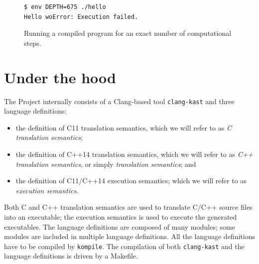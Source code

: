 \documentclass[nolot,nolof,nocover,printed]{fithesis3}
\newcommand{\krun}{\texttt{krun}\xspace}
\newcommand{\kompile}{\texttt{kompile}\xspace}
\newcommand{\clangKast}{\texttt{clang-kast}\xspace}
\newcommand{\Project}{Project\xspace}
\begin{document}
\begin{figure}[ht]
\begin{lstlisting}
$ env DEPTH=675 ./hello
Hello woError: Execution failed.
\end{lstlisting}
\caption{Running a compiled program for an exact number of computational steps.}
\label{fig:runCompiledProgramWithDepth}
\end{figure}




\section{Under the hood}


The \Project internally consists of a Clang-based tool \clangKast and 
three language definitions:
\begin{itemize}
\item the definition of C11 translation semantics, which we will refer to as \textit{C translation semantics};
\item the definition of C++14 translation semantics, which we will refer to as \textit{C++ translation semantics}, or simply \textit{translation semantics}; and
\item the definition of C11/C++14 execution semantics; which we will refer to as \textit{execution semantics}.
\end{itemize}
Both C and C++ translation semantics are used to translate C/C++ source files into an executable; the execution semantics is used to execute the generated executables. The language definitions are composed of many modules; some modules are included in multiple language definitions. All the language definitions have to be compiled by \kompile. The compilation of both \clangKast and the language definitions is driven by a Makefile.
\end{document}
